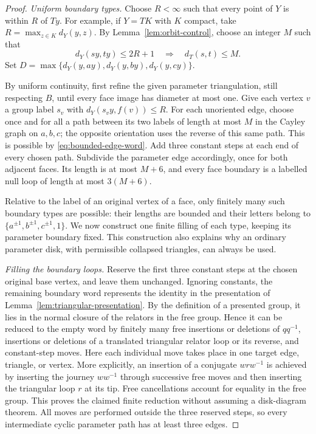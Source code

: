 \begin{proof}
\textit{Uniform boundary types.}
Choose $R<\infty$ such that every point of $Y$ is within $R$ of
$Ty$.  For example, if $Y=TK$ with $K$ compact, take
$R=\max_{z\in K}d_Y(y,z)$.  By Lemma~\ref{lem:orbit-control},
choose an integer $M$ such that
\begin{equation}\label{eq:bounded-edge-word}
  d_Y(sy,ty)\le2R+1\quad\Longrightarrow\quad d_T(s,t)\le M.
\end{equation}
Set
$D=\max\{d_Y(y,ay),d_Y(y,by),d_Y(y,cy)\}$.

By uniform continuity, first refine the given parameter
triangulation, still respecting $B$, until every face image has
diameter at most one.  Give each vertex $v$ a group label $s_v$
with $d_Y(s_vy,f(v))\le R$.  For each unoriented edge, choose once
and for all a path between its two labels of length at most $M$
in the Cayley graph on $a,b,c$; the opposite orientation uses
the reverse of this same path.  This is possible by
\eqref{eq:bounded-edge-word}.  Add three constant steps at each
end of every chosen path.  Subdivide the parameter edge
accordingly, once for both adjacent faces.  Its length is at
most $M+6$, and every face boundary is a labelled null loop
of length at most $3(M+6)$.

Relative to the label of an original vertex of a face, only
finitely many such boundary types are possible: their lengths
are bounded and their letters belong to
$\{a^{\pm1},b^{\pm1},c^{\pm1},1\}$.  We now construct one finite
filling of each type, keeping its parameter boundary fixed.
This construction also explains why an ordinary parameter disk,
with permissible collapsed triangles, can always be used.

\smallskip\noindent\textit{Filling the boundary loops.}
Reserve the first three constant steps at the chosen original
base vertex, and leave them unchanged.  Ignoring constants, the
remaining boundary word represents the identity in the
presentation of Lemma~\ref{lem:triangular-presentation}.  By the
definition of a presented group, it lies in the normal closure
of the relators in the free group.  Hence it can be reduced to
the empty word by finitely many free insertions or deletions
of $qq^{-1}$, insertions or deletions of a translated triangular
relator loop or its reverse, and constant-step moves.
Here each individual move takes place in one target edge,
triangle, or vertex.  More explicitly, an insertion of a
conjugate $w r w^{-1}$ is achieved by inserting the journey
$ww^{-1}$ through successive free moves and then inserting the
triangular loop $r$ at its tip.  Free cancellations account for
equality in the free group.  This proves the claimed finite
reduction without assuming a disk-diagram theorem.  All moves
are performed outside the three reserved steps, so every
intermediate cyclic parameter path has at least three edges.


\end{proof}

